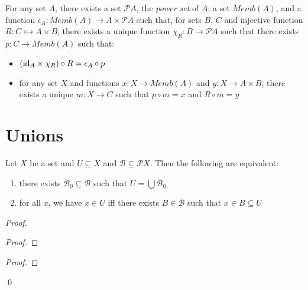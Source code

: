 \begin{ax}
  For any set $A$, there exists a set $\mathcal{P} A$, the \emph{power set} of $A$; a set $Memb(A)$, and a function $\epsilon_A : Memb(A) \rightarrow A \times \mathcal{P} A$ such that, for sets $B$, $C$ and injective function $R : C \rightarrowtail A \times B$, there exists a unique function $\chi_R : B \rightarrow \mathcal{P} A$ such that
  there exists $p : C \rightarrow Memb(A)$ such that:
  \begin{itemize}
    \item
    $(\mathrm{id}_{A} \times \chi_R) \circ R = \epsilon_A \circ p$
    \item
    for any set $X$ and functions $x : X \rightarrow Memb(A)$ and $y : X \rightarrow A \times B$, there exists a unique $m : X \rightarrow C$ such that $p \circ m = x$ and $R \circ m = y$
  \end{itemize}
\end{ax}

\section{Unions}

\begin{prop}
  \label{prop:set_theory:unions}
  Let $X$ be a set and $U \subseteq X$ and $\mathcal{B} \subseteq \mathcal{P} X$. Then the following are equivalent:
  \begin{enumerate}
    \item there exists $\mathcal{B}_0 \subseteq \mathcal{B}$ such that $U = \bigcup \mathcal{B}_0$
    \item for all $x$, we have $x \in U$ iff there exists $B \in \mathcal{B}$ such that $x \in B \subseteq U$
  \end{enumerate}
\end{prop}

\begin{proof}
  \pf
  \begin{proof}
  \end{proof}
  \begin{proof}
  \end{proof}
  \qed
\end{proof}

